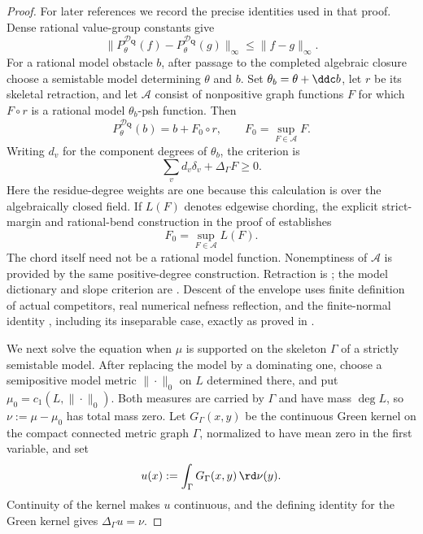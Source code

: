 \begin{proof}
For later references we record the precise identities used in that proof.
Dense rational value-group constants give
\begin{equation}\label{eq:curve-envelope-contraction}
 \bigl\|P^{\mathcal D_{\mathbf Q}}_\theta(f)
       -P^{\mathcal D_{\mathbf Q}}_\theta(g)\bigr\|_\infty
       \leq\|f-g\|_\infty.
\end{equation}
For a rational model obstacle $b$, after passage to the completed
algebraic closure choose a semistable model determining $\theta$ and $b$.
Set $\theta_b=\theta+\ddc b$, let $r$ be its skeletal retraction, and let
$\mathcal A$ consist of nonpositive graph functions $F$ for which
$F\circ r$ is a rational model $\theta_b$-psh function.  Then
\begin{equation}\label{eq:curve-envelope-retraction}
 P^{\mathcal D_{\mathbf Q}}_\theta(b)=b+F_0\circ r,
 \qquad F_0=\sup_{F\in\mathcal A}F.
\end{equation}
Writing $d_v$ for the component degrees of $\theta_b$, the criterion is
\begin{equation}\label{eq:curve-slope-criterion}
 \sum_{v}d_v\delta_v+\Delta_\Gamma F\geq0.
\end{equation}
Here the residue-degree weights are one because this calculation is over
the algebraically closed field.  If $L(F)$ denotes edgewise chording,
the explicit strict-margin and rational-bend construction in the proof of
 establishes
\begin{equation}\label{eq:curve-chord-supremum}
 F_0=\sup_{F\in\mathcal A}L(F).
\end{equation}
The chord itself need not be a rational model function.  Nonemptiness of
$\mathcal A$ is provided by the same positive-degree construction.
Retraction is \cite[Proposition~3.8]{GJKM19}; the model dictionary and
slope criterion are \cite[Propositions~3.5 and~3.7]{GJKM19}.
Descent of the envelope uses finite definition of actual competitors,
real numerical nefness reflection, and the finite-normal identity
\cite[Proposition~2.11]{GJKM19}, including its inseparable case, exactly
as proved in .

We next solve the equation when $\mu$ is supported on the skeleton
$\Gamma$ of a strictly semistable model.  After replacing the model by a
dominating one, choose a semipositive model metric $\|\cdot\|_0$ on $L$
determined there, and put
$\mu_0=c_1(L,\|\cdot\|_0)$.  Both measures are carried by $\Gamma$ and
have mass $\deg L$, so $\nu:=\mu-\mu_0$ has total mass zero.  Let
$G_\Gamma(x,y)$ be the continuous Green kernel on the compact connected
metric graph $\Gamma$, normalized to have mean zero in the first variable,
and set
\[
                   u(x):=\int_\Gamma G_\Gamma(x,y)\,\rd\nu(y).
\]
Continuity of the kernel makes $u$ continuous, and the defining identity
for the Green kernel gives $\Delta_\Gamma u=\nu$.


\end{proof}
